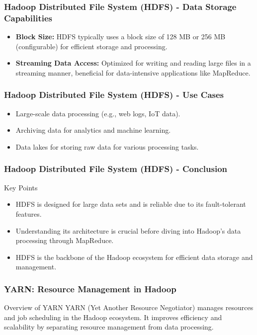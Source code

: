 \documentclass[aspectratio=169]{beamer}
\begin{document}
\begin{frame}[fragile]
    \frametitle{Hadoop Distributed File System (HDFS) - Data Storage Capabilities}
    \begin{itemize}
        \item \textbf{Block Size:} 
        HDFS typically uses a block size of 128 MB or 256 MB (configurable) for efficient storage and processing.
        
        \item \textbf{Streaming Data Access:} 
        Optimized for writing and reading large files in a streaming manner, beneficial for data-intensive applications like MapReduce.
    \end{itemize}
\end{frame}

\begin{frame}[fragile]
    \frametitle{Hadoop Distributed File System (HDFS) - Use Cases}
    \begin{itemize}
        \item Large-scale data processing (e.g., web logs, IoT data).
        \item Archiving data for analytics and machine learning.
        \item Data lakes for storing raw data for various processing tasks.
    \end{itemize}
\end{frame}

\begin{frame}[fragile]
    \frametitle{Hadoop Distributed File System (HDFS) - Conclusion}
    \begin{block}{Key Points}
        \begin{itemize}
            \item HDFS is designed for large data sets and is reliable due to its fault-tolerant features.
            \item Understanding its architecture is crucial before diving into Hadoop's data processing through MapReduce.
            \item HDFS is the backbone of the Hadoop ecosystem for efficient data storage and management.
        \end{itemize}
    \end{block}
\end{frame}

\begin{frame}[fragile]
    \frametitle{YARN: Resource Management in Hadoop}
    \begin{block}{Overview of YARN}
        YARN (Yet Another Resource Negotiator) manages resources and job scheduling in the Hadoop ecosystem.
        It improves efficiency and scalability by separating resource management from data processing.
    \end{block}
\end{frame}
\end{document}
